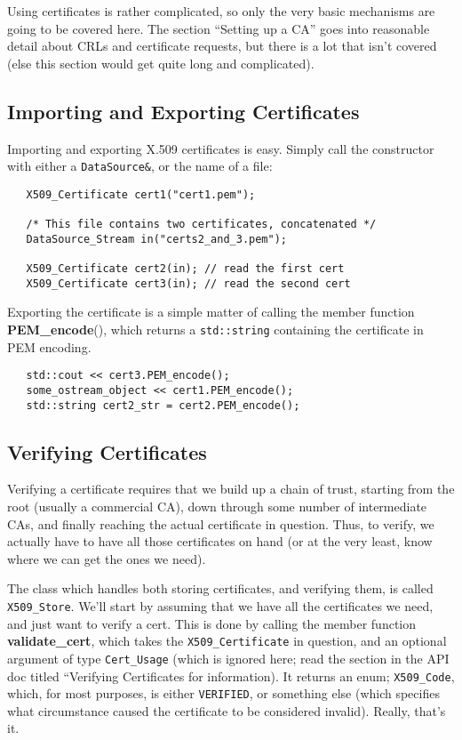 \documentclass{article}
\newcommand{\function}[1]{\textbf{#1}}
\newcommand{\type}[1]{\texttt{#1}}
\begin{document}
Using certificates is rather complicated, so only the very basic mechanisms are
going to be covered here. The section ``Setting up a CA'' goes into reasonable
detail about CRLs and certificate requests, but there is a lot that isn't
covered (else this section would get quite long and complicated).

\subsection{Importing and Exporting Certificates}

Importing and exporting X.509 certificates is easy. Simply call the constructor
with either a \type{DataSource\&}, or the name of a file:

\begin{verbatim}
   X509_Certificate cert1("cert1.pem");

   /* This file contains two certificates, concatenated */
   DataSource_Stream in("certs2_and_3.pem");

   X509_Certificate cert2(in); // read the first cert
   X509_Certificate cert3(in); // read the second cert
\end{verbatim}

Exporting the certificate is a simple matter of calling the member function
\function{PEM\_encode}(), which returns a \type{std::string} containing the
certificate in PEM encoding.

\begin{verbatim}
   std::cout << cert3.PEM_encode();
   some_ostream_object << cert1.PEM_encode();
   std::string cert2_str = cert2.PEM_encode();
\end{verbatim}

\subsection{Verifying Certificates}

Verifying a certificate requires that we build up a chain of trust, starting
from the root (usually a commercial CA), down through some number of
intermediate CAs, and finally reaching the actual certificate in
question. Thus, to verify, we actually have to have all those certificates
on hand (or at the very least, know where we can get the ones we need).

The class which handles both storing certificates, and verifying them, is
called \type{X509\_Store}. We'll start by assuming that we have all the
certificates we need, and just want to verify a cert. This is done by calling
the member function \function{validate\_cert}, which takes the
\type{X509\_Certificate} in question, and an optional argument of type
\type{Cert\_Usage} (which is ignored here; read the section in the API doc
titled ``Verifying Certificates for information). It returns an enum;
\type{X509\_Code}, which, for most purposes, is either \type{VERIFIED}, or
something else (which specifies what circumstance caused the certificate to be
considered invalid). Really, that's it.
\end{document}
